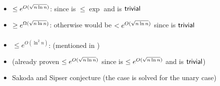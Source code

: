 \paragraph{\TNFA{}\tto\ONFA}
\begin{itemize}
	\item $\le e^{O(\sqrt{n\ln n})}$: since \hyperref[cost:2NFAto1DFAu]{\TNFA{}\tto\ODFA} is $\le\exp$ and \ODFA{}\tto\ONFA is $\mathsf{trivial}$
	\item $\ge e^{\Omega(\sqrt{n\ln n})}$: otherwise \hyperref[cost:2DFAto1NFAu]{\TDFA{}\tto\ONFA} would be $<e^{O(\sqrt{n\ln n})}$ since \TDFA{}\tto\TNFA is $\mathsf{trivial}$
\end{itemize}
\paragraph{\TNFA{}\tto\TDFA}\label{cost:2NFAto2DFAu}
\begin{itemize}
	\item $\le e^{O(\ln^2n)}$: \cite{GefMer+03} (mentioned in \cite{Pig15})
	\item (already proven $\le e^{O(\sqrt{n\ln n})}$ since \hyperref[cost:2NFAto1DFAu]{\TNFA{}\tto\ODFA} is $\le e^{O(\sqrt{n\ln n})}$ and \ODFA{}\tto\TDFA is $\mathsf{trivial}$)
	\item Sakoda and Sipser conjecture (the case \hyperref[cost:1NFAto2DFAu]{\ONFA{}\tto\TDFA} is solved for the unary case)
\end{itemize}


